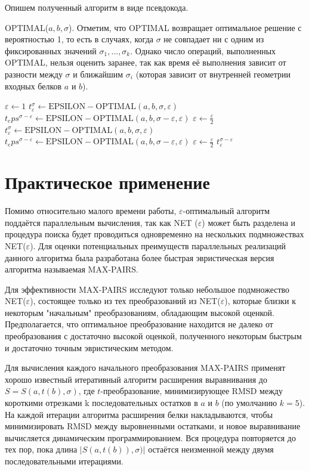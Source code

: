 \documentclass[a4paper]{extreport}
\newcommand{\la}{\leftarrow}
\newcommand{\eps}{\varepsilon}
\begin{document}
Опишем полученный алгоритм в виде псевдокода.

OPTIMAL($a, b, \sigma$). Отметим, что OPTIMAL возвращает оптимальное решение с вероятностью 1, то есть в случаях, когда $\sigma$ не совпадает ни с одним из фиксированных значений $\sigma_1, \dots, \sigma_k$. Однако число операций, выполненных OPTIMAL, нельзя оценить заранее, так как время её выполнения зависит от разности между $\sigma$ и ближайшим $\sigma_i$ (которая зависит от внутренней геометрии входных белков $a$ и $b$). 

\begin{algorithmic}[1]
\State $\eps \la 1$
\State $t_\eps^\sigma \la \mathrm{EPSILON-OPTIMAL}(a, b, \sigma, \eps)$
\State $t_eps^{\sigma - \eps} \la \mathrm{EPSILON-OPTIMAL}(a, b, \sigma - \eps, \eps)$
\State $\eps \la \frac{\eps}{2}$
\While{$|S(a, t_\eps^\sigma (b), \sigma + \eps )| - |S(a, t_\eps^{\sigma - \eps}(b), \sigma ) > 0$}
\State $t_\eps^\sigma \la \mathrm{EPSILON-OPTIMAL}(a, b, \sigma, \eps)$
\State $t_eps^{\sigma - \eps} \la \mathrm{EPSILON-OPTIMAL}(a, b, \sigma - \eps, \eps)$
\State $\eps \la \frac{\eps}{2}$
\EndWhile
\State \Return $t_\eps^{\sigma - \eps}$
\end{algorithmic}

\section{Практическое применение}

Помимо относительно малого времени работы, $\eps$-оптимальный алгоритм поддаётся параллельным вычисления, так как NET ($\eps$) может быть разделена и процедура поиска будет проводиться одновременно на нескольких подмножествах NET($\eps$). Для оценки потенциальных преимуществ параллельных реализаций данного алгоритма была разработана более быстрая эвристическая версия алгоритма называемая MAX-PAIRS.

Для эффективности MAX-PAIRS исследуют только небольшое подмножество NET($\eps$), состоящее только из тех преобразований из NET($\eps$), которые близки к некоторым "начальным" преобразованиям, обладающим высокой оценкой. Предполагается, что оптимальное преобразование находится не далеко от преобразования с достаточно высокой оценкой, полученного некоторым быстрым и достаточно точным эвристическим методом.

Для вычисления каждого начального преобразования MAX-PAIRS применят хорошо известный итеративный алгоритм расширения выравнивания до $S = S(a, t(b), \sigma)$, где $t$-преобразование, минимизирующее RMSD между короткими отрезками k последовательных остатков в $a$ и $b$ (по умолчанию $k = 5$). На каждой итерации алгоритма расширения белки накладываются, чтобы минимизировать RMSD между выровненными остатками, и новое выравнивание вычисляется динамическим программированием. Вся процедура повторяется до тех пор, пока длина $|S(a, t(b)), \sigma)|$ остаётся неизменной между двумя последовательными итерациями.
\end{document}
